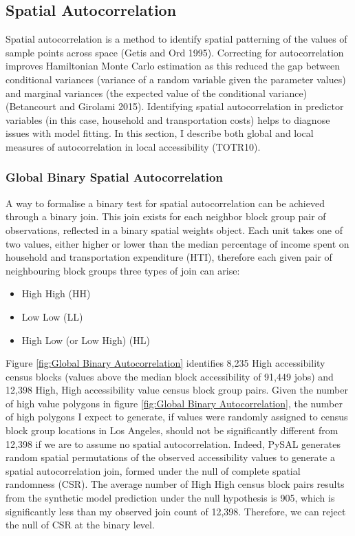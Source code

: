 \documentclass[a4paper,UKenglish]{lipics-v2018}
\begin{document}
\subsection{Spatial Autocorrelation}
Spatial autocorrelation is a method to identify spatial patterning of the values of sample points across space (Getis and Ord 1995). Correcting for autocorrelation improves Hamiltonian Monte Carlo estimation as this reduced the gap between conditional variances (variance of a random variable given the parameter values) and marginal variances (the expected value of the conditional variance) (Betancourt and Girolami 2015). Identifying spatial autocorrelation in predictor variables (in this case, household and transportation costs) helps to diagnose issues with model fitting. In this section, I describe both global and local measures of autocorrelation in local accessibility (TOTR10).

\subsubsection{Global Binary Spatial Autocorrelation}
A way to formalise a binary test for spatial autocorrelation can be achieved through a binary join. This join exists for each neighbor block group pair of observations, reflected in a binary spatial weights object. Each unit takes one of two values, either higher or lower than the median percentage of income spent on household and transportation expenditure (HTI), therefore each given pair of neighbouring block groups three types of join can arise: 

\begin{itemize}
\item High High (HH)
\item Low Low (LL)
\item High Low (or Low High) (HL)
\end{itemize}


Figure \ref{fig:Global Binary Autocorrelation} identifies 8,235 High accessibility census blocks (values above the median block accessibility of 91,449 jobs) and 12,398 High, High accessibility value census block group pairs. Given the number of high value polygons in figure \ref{fig:Global Binary Autocorrelation}, the number of high polygons I expect to generate, if values were randomly assigned to census block group locations in Los Angeles, should not be significantly different from 12,398 if we are to assume no spatial autocorrelation. Indeed, PySAL generates random spatial permutations of the observed accessibility values to generate a spatial autocorrelation join, formed under the null of complete spatial randomness (CSR). The average number of High High census block pairs results from the synthetic model prediction under the null hypothesis is 905, which is significantly less than my observed join count of 12,398. Therefore, we can reject the null of CSR at the binary level.
\end{document}
